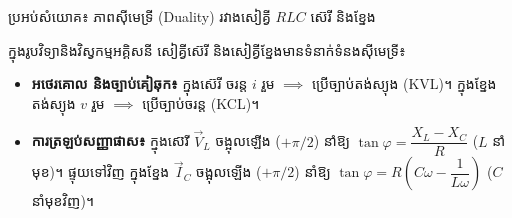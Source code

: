 \pagebreak
\begin{formulabox}[breakable=false, top=6pt, bottom=6pt]{ប្រអប់សំយោគ៖ ភាពស៊ីមេទ្រី (Duality) រវាងសៀគ្វី $RLC$ ស៊េរី និងខ្នែង}
	\raggedright
	\small
	ក្នុងរូបវិទ្យានិងវិស្វកម្មអគ្គិសនី សៀគ្វីស៊េរី និងសៀគ្វីខ្នែងមានទំនាក់ទំនងស៊ីមេទ្រី៖
	\begin{itemize}[itemsep=1.5pt, topsep=1pt, parsep=0pt, leftmargin=1.3em]
		\item \textbf{អថេរគោល និងច្បាប់គៀឆុក៖} ក្នុងស៊េរី ចរន្ត $i$ រួម $\implies$ ប្រើច្បាប់តង់ស្យុង (KVL)។ ក្នុងខ្នែង តង់ស្យុង $v$ រួម $\implies$ ប្រើច្បាប់ចរន្ត (KCL)។
		\item \textbf{ការត្រឡប់សញ្ញាផាស៖} ក្នុងស៊េរី $\vec{V}_L$ ចង្អុលឡើង ($+\pi/2$) នាំឱ្យ $\tan\varphi = \dfrac{X_L - X_C}{R}$ ($L$ នាំមុខ)។ ផ្ទុយទៅវិញ ក្នុងខ្នែង $\vec{I}_C$ ចង្អុលឡើង ($+\pi/2$) នាំឱ្យ $\tan\varphi = R\left(C\omega - \dfrac{1}{L\omega}\right)$ ($C$ នាំមុខវិញ)។
	\end{itemize}


\end{formulabox}

